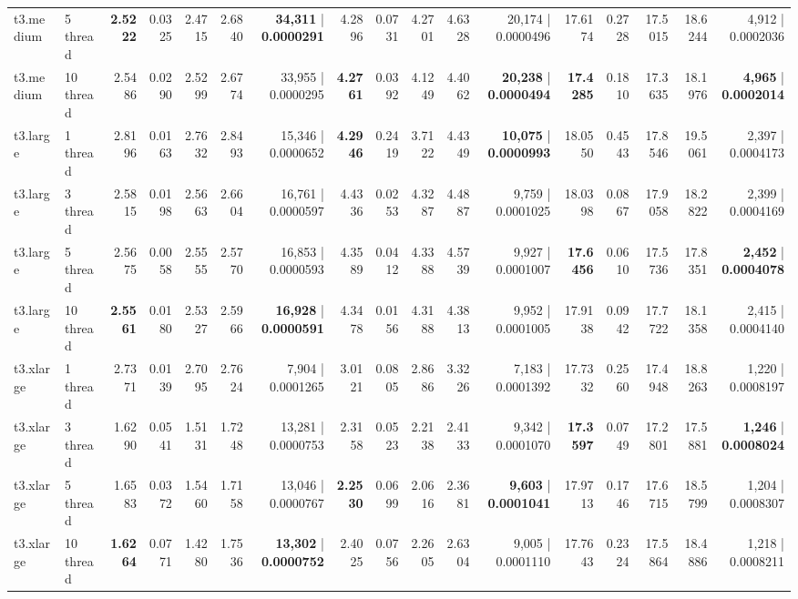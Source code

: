 \documentclass[conference]{IEEEtran}
\begin{document}
\begin{table}[h]
{\begin{tabular}{ll|rrrrr|rrrrr|rrrrr}
			t3.medium & 5 thread & \textbf{2.5222} & 0.0325 & 2.4715 & 2.6840 & \textbf{34,311} | \textbf{0.0000291} & 4.2896 & 0.0731 & 4.2701 & 4.6328 & 20,174 | 0.0000496 & 17.6174 & 0.2728 & 17.5015 & 18.6244 & 4,912 | 0.0002036 \\
			t3.medium & 10 thread & 2.5486 & 0.0290 & 2.5299 & 2.6774 & 33,955 | 0.0000295 & \textbf{4.2761} & 0.0392 & 4.1249 & 4.4062 & \textbf{20,238} | \textbf{0.0000494} & \textbf{17.4285} & 0.1810 & 17.3635 & 18.1976 & \textbf{4,965} | \textbf{0.0002014} \\
			\midrule
			t3.large & 1 thread & 2.8196 & 0.0163 & 2.7632 & 2.8493 & 15,346 | 0.0000652 & \textbf{4.2946} & 0.2419 & 3.7122 & 4.4349 & \textbf{10,075} | \textbf{0.0000993} & 18.0550 & 0.4543 & 17.8546 & 19.5061 & 2,397 | 0.0004173 \\
			t3.large & 3 thread & 2.5815 & 0.0198 & 2.5663 & 2.6604 & 16,761 | 0.0000597 & 4.4336 & 0.0253 & 4.3287 & 4.4887 & 9,759 | 0.0001025 & 18.0398 & 0.0867 & 17.9058 & 18.2822 & 2,399 | 0.0004169 \\
			t3.large & 5 thread & 2.5675 & 0.0058 & 2.5555 & 2.5770 & 16,853 | 0.0000593 & 4.3589 & 0.0412 & 4.3388 & 4.5739 & 9,927 | 0.0001007 & \textbf{17.6456} & 0.0610 & 17.5736 & 17.8351 & \textbf{2,452} | \textbf{0.0004078} \\
			t3.large & 10 thread & \textbf{2.5561} & 0.0180 & 2.5327 & 2.5966 & \textbf{16,928} | \textbf{0.0000591} & 4.3478 & 0.0156 & 4.3188 & 4.3813 & 9,952 | 0.0001005 & 17.9138 & 0.0942 & 17.7722 & 18.1358 & 2,415 | 0.0004140 \\
			\midrule
			t3.xlarge & 1 thread & 2.7371 & 0.0139 & 2.7095 & 2.7624 & 7,904 | 0.0001265 & 3.0121 & 0.0805 & 2.8686 & 3.3226 & 7,183 | 0.0001392 & 17.7332 & 0.2560 & 17.4948 & 18.8263 & 1,220 | 0.0008197 \\
			t3.xlarge & 3 thread & 1.6290 & 0.0541 & 1.5131 & 1.7248 & 13,281 | 0.0000753 & 2.3158 & 0.0523 & 2.2138 & 2.4133 & 9,342 | 0.0001070 & \textbf{17.3597} & 0.0749 & 17.2801 & 17.5881 & \textbf{1,246} | \textbf{0.0008024} \\
			t3.xlarge & 5 thread & 1.6583 & 0.0372 & 1.5460 & 1.7158 & 13,046 | 0.0000767 & \textbf{2.2530} & 0.0699 & 2.0616 & 2.3681 & \textbf{9,603} | \textbf{0.0001041} & 17.9713 & 0.1746 & 17.6715 & 18.5799 & 1,204 | 0.0008307 \\
			t3.xlarge & 10 thread & \textbf{1.6264} & 0.0771 & 1.4280 & 1.7536 & \textbf{13,302} | \textbf{0.0000752} & 2.4025 & 0.0756 & 2.2605 & 2.6304 & 9,005 | 0.0001110 & 17.7643 & 0.2324 & 17.5864 & 18.4886 & 1,218 | 0.0008211 \\

\end{tabular}}
\end{table}
\end{document}
